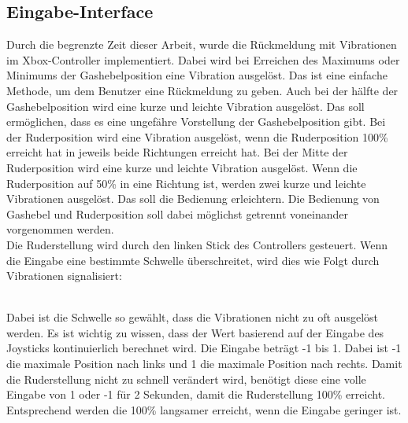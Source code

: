 \subsection{Eingabe-Interface}
Durch die begrenzte Zeit dieser Arbeit, wurde die Rückmeldung mit Vibrationen im Xbox-Controller implementiert.
Dabei wird bei Erreichen des Maximums oder Minimums der Gashebelposition eine Vibration ausgelöst. Das ist eine einfache
Methode, um dem Benutzer eine Rückmeldung zu geben. Auch bei der hälfte der Gashebelposition wird eine kurze und leichte 
Vibration ausgelöst. Das soll ermöglichen, dass es eine ungefähre Vorstellung der Gashebelposition gibt.
Bei der Ruderposition wird eine Vibration ausgelöst, wenn die Ruderposition 100\% erreicht hat in jeweils beide Richtungen
erreicht hat. Bei der Mitte der Ruderposition wird eine kurze und leichte Vibration ausgelöst. Wenn die 
Ruderposition auf 50\% in eine Richtung ist, werden zwei kurze und leichte Vibrationen ausgelöst. Das soll die Bedienung
erleichtern. Die Bedienung von Gashebel und Ruderposition soll dabei möglichst getrennt voneinander vorgenommen werden.
\\
Die Ruderstellung wird durch den linken Stick des Controllers gesteuert. Wenn die Eingabe eine bestimmte Schwelle überschreitet,
wird dies wie Folgt durch Vibrationen signalisiert: \\
\begin{figure}[h!]
    \centering
\end{figure}
\\
Dabei ist die Schwelle so gewählt, dass die Vibrationen nicht zu oft ausgelöst werden. 
Es ist wichtig zu wissen, dass der Wert basierend auf der Eingabe des Joysticks kontinuierlich berechnet wird.
Die Eingabe beträgt -1 bis 1. Dabei ist -1 die maximale Position nach links und 1 die maximale Position nach rechts.
Damit die Ruderstellung nicht zu schnell verändert wird, benötigt diese eine volle Eingabe von 1 oder -1 für 2 Sekunden,
damit die Ruderstellung 100\% erreicht. Entsprechend werden die 100\% langsamer erreicht, wenn die Eingabe geringer
ist.

